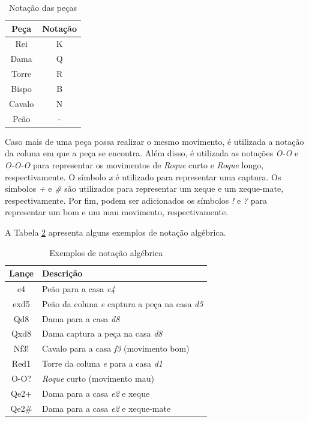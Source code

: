 \begin{table}[H]
    \centering
    \caption{Notação das peças}
    \label{tab:xadrezNotacao}
    \begin{tabular}{|c|c|}
        \hline
        \textbf{Peça} & \textbf{Notação} \\ \hline
        Rei           & K               \\ \hline
        Dama          & Q               \\ \hline
        Torre         & R               \\ \hline
        Bispo         & B               \\ \hline
        Cavalo        & N               \\ \hline
        Peão          & -               \\ \hline
    \end{tabular}
\end{table}

Caso mais de uma peça possa realizar o mesmo movimento, é utilizada a notação da coluna em que a peça se encontra.
Além disso, é utilizada as notações \textit{O-O} e \textit{O-O-O} para representar os movimentos de \textit{Roque} curto e \textit{Roque} longo, respectivamente.
O símbolo \textit{x} é utilizado para representar uma captura.
Os símbolos \textit{+} e \textit{\#} são utilizados para representar um xeque e um xeque-mate, respectivamente.
Por fim, podem ser adicionados os símbolos \textit{!} e \textit{?} para representar um bom e um mau movimento, respectivamente.

A Tabela \ref{tab:xadrezNotacaoExemplo} apresenta alguns exemplos de notação algébrica.

\begin{table}[H]
    \centering
    \caption{Exemplos de notação algébrica}
    \label{tab:xadrezNotacaoExemplo}
    \begin{tabular}{|c|l|}
        \hline
        \textbf{Lançe} & \textbf{Descrição} \\ \hline
        e4             & Peão para a casa \textit{e4} \\ \hline
        exd5           & Peão da coluna \textit{e} captura a peça na casa \textit{d5} \\ \hline
        Qd8            & Dama para a casa \textit{d8} \\ \hline
        Qxd8           & Dama captura a peça na casa \textit{d8} \\ \hline
        Nf3!           & Cavalo para a casa \textit{f3} (movimento bom) \\ \hline
        Red1           & Torre da coluna \textit{e} para a casa \textit{d1} \\ \hline
        O-O?           & \textit{Roque} curto (movimento mau) \\ \hline
        Qe2+           & Dama para a casa \textit{e2} e xeque \\ \hline
        Qe2\#          & Dama para a casa \textit{e2} e xeque-mate \\ \hline
    \end{tabular}
\end{table}

